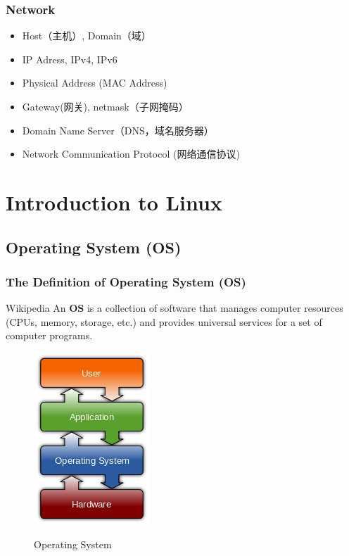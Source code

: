 \documentclass[red]{beamer}
\begin{document}
\begin{CJK*}{UTF8}{gbsn}
\begin{frame}
\frametitle{Network}
\begin{itemize}
	\item Host（主机）, Domain（域）
	\item IP Adress, IPv4, IPv6
	\item Physical Address (MAC Address)
	\item Gateway(网关), netmask（子网掩码）
	\item Domain Name Server（DNS，域名服务器）
	\item Network Communication Protocol (网络通信协议)
\end{itemize}
\end{frame}



\section[Linux Overview]{Introduction to Linux}

\subsection{Operating System (OS)}
\begin{frame}
\frametitle{The Definition of Operating System (OS)}
\begin{block}{Wikipedia}
An \textbf{OS} is a collection of software that manages computer resources 
(CPUs, memory, storage, etc.) and provides universal services for a set of 
computer programs.
\end{block}
\begin{center}
\begin{figure}
  \includegraphics[scale=0.60]{images/os.png}\\
  \caption{Operating System}
  \label{fig1}
\end{figure}
\end{center}
\end{frame}


\end{CJK*}
\end{document}
